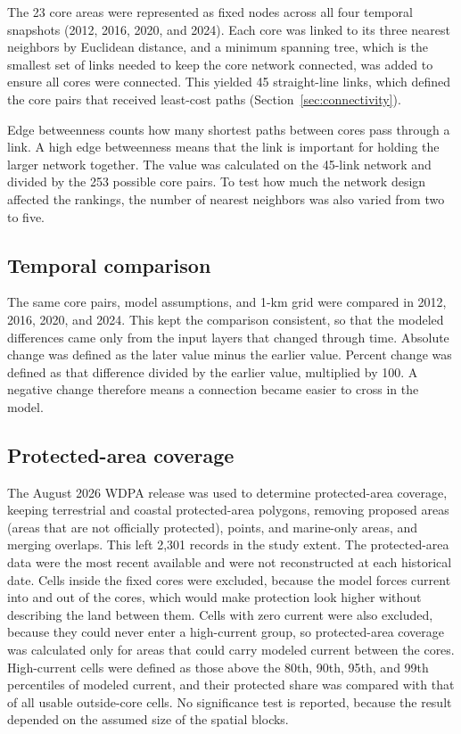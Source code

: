 The 23 core areas were represented as fixed nodes across all four temporal snapshots (2012, 2016, 2020, and 2024). Each core was linked to its three nearest neighbors by Euclidean distance, and a minimum spanning tree, which is the smallest set of links needed to keep the core network connected, was added to ensure all cores were connected. This yielded 45 straight-line links, which defined the core pairs that received least-cost paths (Section~\ref{sec:connectivity}).

Edge betweenness counts how many shortest paths between cores pass through a link. A high edge betweenness means that the link is important for holding the larger network together. The value was calculated on the 45-link network and divided by the 253 possible core pairs. To test how much the network design affected the rankings, the number of nearest neighbors was also varied from two to five.

\subsection{Temporal comparison}
\label{sec:temporal}

The same core pairs, model assumptions, and 1-km grid were compared in 2012, 2016, 2020, and 2024. This kept the comparison consistent, so that the modeled differences came only from the input layers that changed through time. Absolute change was defined as the later value minus the earlier value. Percent change was defined as that difference divided by the earlier value, multiplied by 100. A negative change therefore means a connection became easier to cross in the model.

\subsection{Protected-area coverage}
\label{sec:pa}

The August 2026 WDPA release \parencite{unepwcmc2026wdpa} was used to determine protected-area coverage, keeping terrestrial and coastal protected-area polygons, removing proposed areas (areas that are not officially protected), points, and marine-only areas, and merging overlaps. This left 2,301 records in the study extent. The protected-area data were the most recent available and were not reconstructed at each historical date. Cells inside the fixed cores were excluded, because the model forces current into and out of the cores, which would make protection look higher without describing the land between them. Cells with zero current were also excluded, because they could never enter a high-current group, so protected-area coverage was calculated only for areas that could carry modeled current between the cores. High-current cells were defined as those above the 80th, 90th, 95th, and 99th percentiles of modeled current, and their protected share was compared with that of all usable outside-core cells. No significance test is reported, because the result depended on the assumed size of the spatial blocks.

